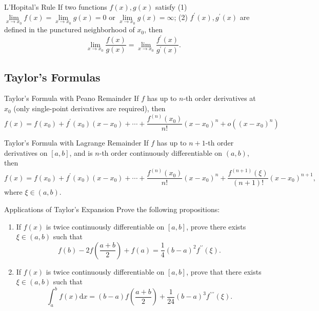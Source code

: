 \begin{theorem}{L'Hopital's Rule}{}
  If two functions $f(x), g(x)$ satisfy
  (1)$\lim \limits _{x \rightarrow x_0} f(x) = \lim \limits _{x \rightarrow x_0}
  g(x) = 0$ or
  $\lim \limits _{x \rightarrow x_0} g(x) = \infty$;
  (2) $f^{\prime}(x), g^{\prime}(x)$ are defined in the punctured neighborhood
  of $x_0$, then
  \begin{equation}
    \lim \limits _{x \rightarrow x_0} \frac{f(x)}{g(x)}
    = \lim \limits _{x \rightarrow x_0} \frac{f^{\prime}(x)}{g^{\prime}(x)}.
  \end{equation}
\end{theorem}


\subsection{Taylor's Formulas}

\begin{theorem}{Taylor's Formula with Peano Remainder}{}
  If $f$ has up to $n$-th order derivatives at $x_0$ (only single-point
  derivatives are required), then
  \begin{equation}
    f(x)=f(x_0)+f^{\prime}(x_0)(x-x_0)+\cdots+\frac{f^{(n)}(x_0)}{n!}(x-x_0)^n+o((x-x_0)^n)
  \end{equation}
\end{theorem}

\begin{theorem}{Taylor's Formula with Lagrange Remainder}{}
  If $f$ has up to $n + 1$-th order derivatives on $[a, b]$,
  and is $n$-th order continuously differentiable on $(a, b)$,
  then
  \begin{equation}
    f(x)=f(x_0)+f^{\prime}(x_0)(x-x_0)+\cdots+\frac{f^{(n)}(x_0)}{n!}(x-x_0)^n+\frac{f^{(n+1)}(\xi)}{(n+1)!}(x-x_0)^{n+1},
  \end{equation}
  where $\xi \in (a, b)$.
\end{theorem}

\begin{example}{Applications of Taylor's Expansion}{}
  Prove the following propositions:
  \begin{enumerate}
  \item If $f(x)$ is twice continuously differentiable on $[a, b]$,
    prove there exists $\xi \in (a, b)$ such that
    \begin{equation}
      f(b) - 2 f(\frac{a+b}{2}) + f(a)
      = \frac{1}{4}(b-a)^2 f^{\prime\prime}(\xi).
    \end{equation}
  \item If $f(x)$ is twice continuously differentiable on $[a, b]$,
    prove that there exists $\xi \in (a, b)$ such that
    \begin{equation}
      \int_a^b f(x)\mathrm{d} x
      = (b-a) f(\frac{a+b}{2}) + \frac{1}{24} (b-a)^3 f^{\prime\prime\prime}(\xi).
    \end{equation}
  \end{enumerate}
\end{example}

